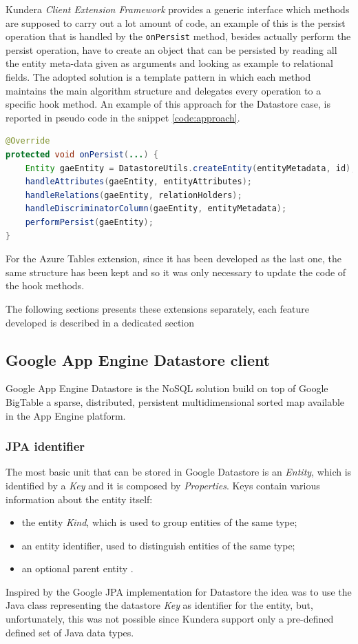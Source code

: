 \noindent Kundera \textit{Client Extension Framework} provides a generic interface which methods are supposed to carry out a lot amount of code, an example of this is the persist operation that is handled by the \texttt{onPersist} method, besides actually perform the persist operation, have to create an object that can be persisted by reading all the entity meta-data given as arguments and looking as example to relational fields.
\noindent The adopted solution is a template pattern in which each method maintains the main algorithm structure and delegates every operation to a specific hook method.
An example of this approach for the Datastore case, is reported in pseudo code in the snippet \ref{code:approach}.

\begin{lstlisting}[language=Java, caption=Template for the persist operation, label=code:approach]
@Override
protected void onPersist(...) {
    Entity gaeEntity = DatastoreUtils.createEntity(entityMetadata, id);
    handleAttributes(gaeEntity, entityAttributes);
    handleRelations(gaeEntity, relationHolders);
    handleDiscriminatorColumn(gaeEntity, entityMetadata);
    performPersist(gaeEntity);
}
\end{lstlisting}

\noindent For the Azure Tables extension, since it has been developed as the last one, the same structure has been kept and so it was only necessary to update the code of the hook methods.

\noindent The following sections presents these extensions separately, each feature developed is described in a dedicated section

\subsection{Google App Engine Datastore client}
\label{sec:kundera-datastore}
Google App Engine Datastore \cite{online:datastore} is the NoSQL solution build on top of Google BigTable a sparse, distributed, persistent multidimensional sorted map available in the App Engine platform. 

\subsubsection{JPA identifier}
The most basic unit that can be stored in Google Datastore is an \textit{Entity}, which is identified by a \textit{Key} and it is composed by \textit{Properties}.
Keys contain various information about the entity itself:
\begin{itemize}
\item the entity \textit{Kind}, which is used to group entities of the same type;
\item an entity identifier, used to distinguish entities of the same type;
\item an optional parent entity .
\end{itemize}
Inspired by the Google JPA implementation for Datastore \cite{online:googlejpa} the idea was to use the Java class representing the datastore \textit{Key} as identifier for the entity, but, unfortunately, this was not possible since Kundera support only a pre-defined defined set of Java data types.

